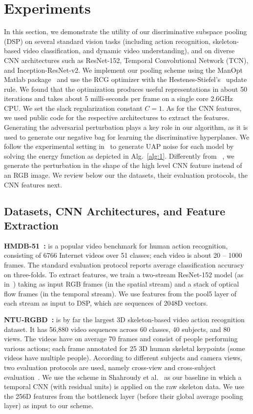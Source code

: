 \documentclass[runningheads]{llncs}
\begin{document}
 \section{Experiments}
\label{experiment}
In this section, we demonstrate the utility of our discriminative subspace pooling (DSP) on several standard vision tasks (including action recognition, skeleton-based video classification, and dynamic video understanding), and on diverse CNN architectures such as ResNet-152, Temporal Convolutional Network (TCN), and Inception-ResNet-v2.  We implement our pooling scheme using the ManOpt Matlab package~\cite{boumal2014manopt} and use the RCG optimizer with the Hestenes-Stiefel's~\cite{hager2005new} update rule. We found that the optimization produces useful representations in about 50 iterations and takes about 5 milli-seconds per frame on a single core 2.6GHz CPU.  We set the slack regularization constant $C=1$. As for the CNN features, we used public code for the respective architectures to extract the features. Generating the adversarial perturbation plays a key role in our algorithm, as it is used to generate our negative bag for learning the discriminative hyperplanes. We follow the experimental setting in~\cite{moosavi2017universal} to generate UAP noise for each model by solving the energy function as depicted in Alg.~\ref{alg:1}. Differently from ~\cite{moosavi2017universal}, we generate the perturbation in the shape of the high level CNN feature instead of an RGB image. We review below our the datasets, their evaluation protocols, the CNN features next.

\subsection{Datasets, CNN Architectures, and Feature Extraction}
\noindent\textbf{HMDB-51~\cite{kuehne2011hmdb}:} is a popular video benchmark for human action recognition, consisting of 6766 Internet videos over 51 classes; each video is about 20 -- 1000 frames. The standard evaluation protocol reports average classification accuracy on three-folds. To extract features, we train a two-stream ResNet-152 model (as in~\cite{simonyan2014two}) taking as input RGB frames (in the spatial stream) and a stack of optical flow frames (in the temporal stream). We use features from the pool5 layer of each stream as input to DSP, which are sequences of 2048D vectors.

\noindent\textbf{NTU-RGBD~\cite{shahroudy2016ntu}:} is by far the largest 3D skeleton-based video action recognition dataset. It has 56,880 video sequences across 60 classes, 40 subjects, and 80 views. The videos have on average 70 frames and consist of people performing various actions; each frame annotated for 25 3D human skeletal keypoints (some videos have multiple people). According to different subjects and  camera views, two evaluation protocols are used, namely cross-view and cross-subject evaluation~\cite{shahroudy2016ntu}. We use the scheme in Shahroudy et al.~\cite{shahroudy2016ntu} as our baseline in which a temporal CNN (with residual units) is applied on the raw skeleton data. We use the 256D features from the bottleneck layer (before their global average pooling layer) as input to our scheme. 
\end{document}
